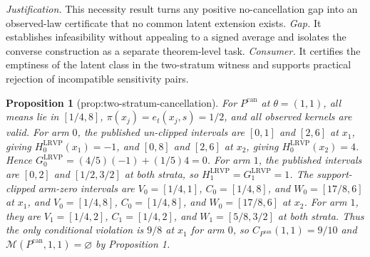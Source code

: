\documentclass{article}
\newtheorem{proposition}{Proposition}
\begin{document}
\par\smallskip\noindent \textit{Justification.} This necessity result turns any positive no-cancellation gap into an observed-law certificate that no common latent extension exists. \textit{Gap.} It establishes infeasibility without appealing to a signed average and isolates the converse construction as a separate theorem-level task. \textit{Consumer.} It certifies the emptiness of the latent class in the two-stratum witness and supports practical rejection of incompatible sensitivity pairs.

\begin{proposition}[prop:two-stratum-cancellation]\label{prop:two-stratum-cancellation}
For \(P^{\mathrm{can}}\) at \(\theta=(1,1)\), all means lie in \([1/4,8]\), \(\pi(x_j)=e_t(x_j,s)=1/2\), and all observed kernels are valid. For arm \(0\), the published un-clipped intervals are \([0,1]\) and \([2,6]\) at \(x_1\), giving \(H_0^{\mathrm{LRVP}}(x_1)=-1\), and \([0,8]\) and \([2,6]\) at \(x_2\), giving \(H_0^{\mathrm{LRVP}}(x_2)=4\). Hence \(G_0^{\mathrm{LRVP}}=(4/5)(-1)+(1/5)4=0\). For arm \(1\), the published intervals are \([0,2]\) and \([1/2,3/2]\) at both strata, so \(H_1^{\mathrm{LRVP}}=G_1^{\mathrm{LRVP}}=1\). The support-clipped arm-zero intervals are \(V_0=[1/4,1]\), \(C_0=[1/4,8]\), and \(W_0=[17/8,6]\) at \(x_1\), and \(V_0=[1/4,8]\), \(C_0=[1/4,8]\), and \(W_0=[17/8,6]\) at \(x_2\). For arm \(1\), they are \(V_1=[1/4,2]\), \(C_1=[1/4,2]\), and \(W_1=[5/8,3/2]\) at both strata. Thus the only conditional violation is \(9/8\) at \(x_1\) for arm \(0\), so \(C_{P^{\mathrm{can}}}(1,1)=9/10\) and \(\mathcal M(P^{\mathrm{can}},1,1)=\varnothing\) by Proposition 1.
\end{proposition}
\end{document}
